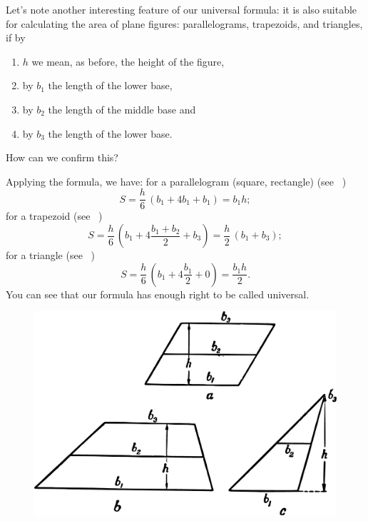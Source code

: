 \ques Let's note another interesting feature of our universal formula: it is also suitable for calculating the area of plane figures: parallelograms, trapezoids, and triangles, if by 
\begin{enumerate}[label=\textsection]
\item \( h \) we mean, as before, the height of the figure, 
\item by \( b_{1} \) the length of the lower base, 
\item by \( b_{2} \) the length of the middle base and 
\item by $b_{3}$ the length of the lower base. 
\end{enumerate}
How can we confirm this?

\ans Applying the formula, we have: for a parallelogram (square, rectangle) (see ~)
\begin{equation*}%
S = \frac{h}{6}\, (b_{1} + 4 b_{1} + b_{1}) = b_{1}h;
\end{equation*}
for a trapezoid (see ~)
\begin{equation*}%
S = \frac{h}{6}\, \left( b_{1} + 4 \frac{b_{1} + b_{2}}{2} + b_{3} \right) = \frac{h}{2}\,(b_{1} + b_{3});
\end{equation*}
for a triangle (see ~)
\begin{equation*}%
S = \frac{h}{6}\, \left( b_{1} + 4 \frac{b_{1}}{2} + 0 \right) = \frac{b_{1}h}{2}.
\end{equation*}
You can see that our formula has enough right to be called universal.

\begin{figure}[h!]
\centering
\includegraphics[width=\textwidth]{figures/ch-01/fig-01-18.pdf}
\end{figure}


